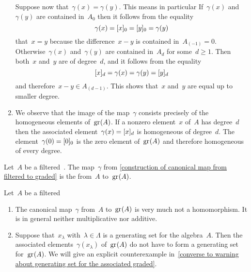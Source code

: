 \begin{fluff}
\begin{enumerate}
			Suppose now that~$\gamma(x) = \gamma(y)$.
			This means in particular
			If~$\gamma(x)$ and~$\gamma(y)$ are contained in~$A_0$ then it follows from the equality
			\[
				\gamma(x)
				=
				\lbrack x\rbrack_0
				=
				\lbrack y\rbrack_0
				=
				\gamma(y)
			\]
			that~$x = y$ because the difference~$x - y$ is contained in~$A_{(-1)} = 0$.
			Otherwise~$\gamma(x)$ and~$\gamma(y)$ are contained in~$A_d$ for some~$d \geq 1$.
			Then both~$x$ and~$y$ are of degree~$d$, and it follows from the equality
			\[
				\lbrack x\rbrack_d
				=
				\gamma(x)
				=
				\gamma(y)
				=
				\lbrack y\rbrack_d
			\]
			and therefore~$x - y \in A_{(d-1)}$.
			This shows that~$x$ and~$y$ are equal up to smaller degree.
		\item
			We observe that the image of the map~$\gamma$ consists precisely of the homogeneous elements of~$\gr(A)$.
			If a nonzero element~$x$ of~$A$ has degree~$d$ then the associated element~$\gamma(x) = \lbrack x\rbrack_d$ is homogeneous of degree~$d$.
			The element~$\gamma(0) = \lbrack0\rbrack_0$ is the zero element of~$\gr(A)$ and therefore homogeneous of every degree.
	\end{enumerate}
\end{fluff}


\begin{definition}
	Let~$A$ be a filtered~\algebra{$\kf$}.
	The map~$\gamma$ from \cref{construction of canonical map from filtered to graded} is the  from~$A$ to~$\gr(A)$.
\end{definition}



\begin{warning}
	\label{generators of associated graded}
	Let~$A$ be a filtered~{\algebra{$\kf$}}
	\begin{enumerate}
		\item
			The canonical map~$\gamma$ from~$A$ to~$\gr(A)$ is very much not a homomorphism.
			It is in general neither multiplicative nor additive.
		\item
			\label{generators of associated graded part}
			Suppose that~$x_\lambda$ with~$\lambda \in \Lambda$ is a generating set for the algebra~$A$.
			Then the associated elements~$\gamma(x_\lambda)$ of~$\gr(A)$ do not have to form a generating set for~$\gr(A)$.
			We will give an explicit counterexample in~\cref{converse to warning about generating set for the associated graded}.
	\end{enumerate}
\end{warning}



